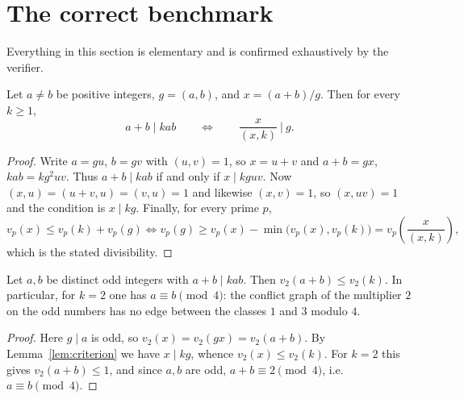 \documentclass[11pt]{article}
\begin{document}
\section{The correct benchmark}\label{sec:benchmark}

Everything in this section is elementary and is confirmed exhaustively by the
verifier.

\begin{lemma}\label{lem:criterion}
Let \(a\ne b\) be positive integers, \(g=(a,b)\), and \(x=(a+b)/g\). Then for
every \(k\geq1\),
\[
 a+b\mid kab
 \qquad\Longleftrightarrow\qquad
 \frac{x}{(x,k)}\ \Big|\ g .
\]
\end{lemma}

\begin{proof}
Write \(a=gu\), \(b=gv\) with \((u,v)=1\), so \(x=u+v\) and \(a+b=gx\),
\(kab=kg^2uv\). Thus \(a+b\mid kab\) if and only if \(x\mid kguv\). Now
\((x,u)=(u+v,u)=(v,u)=1\) and likewise \((x,v)=1\), so \((x,uv)=1\) and the
condition is \(x\mid kg\). Finally, for every prime \(p\),
\[
 v_p(x)\leq v_p(k)+v_p(g)
 \iff
 v_p(g)\geq v_p(x)-\min\bigl(v_p(x),v_p(k)\bigr)
 =v_p\!\left(\frac{x}{(x,k)}\right),
\]
which is the stated divisibility.
\end{proof}

\begin{corollary}\label{cor:twoadic}
Let \(a,b\) be distinct odd integers with \(a+b\mid kab\). Then
\(v_2(a+b)\leq v_2(k)\). In particular, for \(k=2\) one has
\(a\equiv b\pmod4\): the conflict graph of the multiplier \(2\) on the odd
numbers has no edge between the classes \(1\) and \(3\) modulo \(4\).
\end{corollary}

\begin{proof}
Here \(g\mid a\) is odd, so \(v_2(x)=v_2(gx)=v_2(a+b)\). By
Lemma~\ref{lem:criterion} we have \(x\mid kg\), whence
\(v_2(x)\leq v_2(k)\). For \(k=2\) this gives \(v_2(a+b)\leq1\), and since
\(a,b\) are odd, \(a+b\equiv2\pmod4\), i.e.\ \(a\equiv b\pmod4\).
\end{proof}
\end{document}
